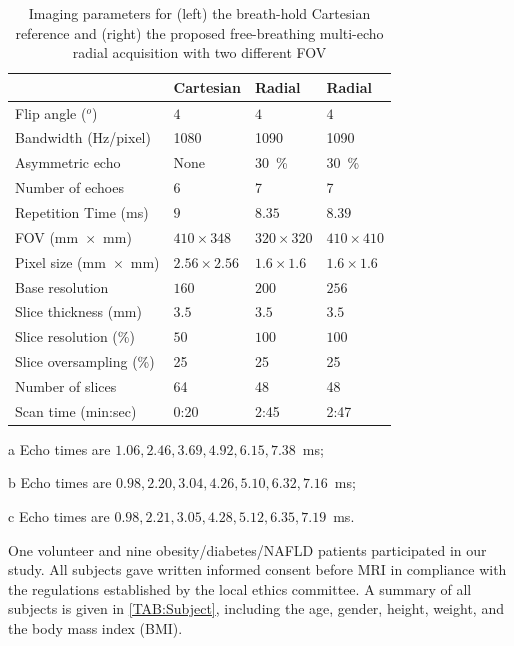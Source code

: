 \documentclass[journal,twoside,web]{ieeecolor}
\begin{document}
\begin{table}
	\begin{threeparttable}
		\caption{Imaging parameters for (left) the breath-hold Cartesian reference 
			and (right) the proposed free-breathing multi-echo radial acquisition 
			with two different FOV}
		\label{TAB:Protocol}
		\setlength{\tabcolsep}{3pt}
		\begin{tabular}{m{} m{} m{} m{}}
			\toprule
			& Cartesian & Radial & Radial \\
			\hline
			Flip angle ($^o$) & $4$ & $4$ & $4$ \\
			Bandwidth (Hz/pixel) & 1080 & 1090 & 1090 \\
			Asymmetric echo & None & \SI{30}{\percent} & \SI{30}{\percent} \\
			Number of echoes & 6\tnote{a} & 7\tnote{b} & 7\tnote{c} \\
			Repetition Time (\si{\milli\second}) & $9$ & $8.35$ & $8.39$ \\
			FOV (mm~$\times$~mm) & $410 \times 348$ & $320 \times 320$ & $410 \times 410$ \\
			Pixel size (mm~$\times$~mm) & $2.56 \times 2.56$ & $1.6 \times 1.6$ & $1.6 \times 1.6$ \\
			Base resolution & $160$ & $200$ & $256$ \\
			Slice thickness (\si{\milli\meter}) & $3.5$ & $3.5$ & $3.5$ \\
			Slice resolution (\si{\percent}) & $50$ & $100$ & $100$ \\
			Slice oversampling (\si{\percent}) & 25 & 25 & 25 \\
			Number of slices & 64 & 48 & 48 \\
			Scan time (min:sec) & 0:20 & 2:45 & 2:47 \\
			\bottomrule
		\end{tabular}
		\begin{tablenotes}
			\item[a] Echo times are $1.06, 2.46, 3.69, 4.92, 6.15, 7.38$~ms;
			\item[b] Echo times are $0.98, 2.20, 3.04, 4.26, 5.10, 6.32, 7.16$~ms;
			\item[c] Echo times are $0.98, 2.21, 3.05, 4.28, 5.12, 6.35, 7.19$~ms.
		\end{tablenotes}
	\end{threeparttable}
\end{table}

One volunteer and nine obesity/diabetes/NAFLD patients participated in our study.
All subjects gave written informed consent before MRI 
in compliance with the regulations established by the local ethics committee. 
A summary of all subjects is given in \cref{TAB:Subject}, 
including the age, gender, height, weight, and the body mass index (BMI).
\end{document}
